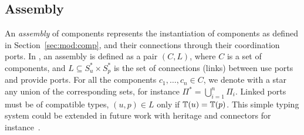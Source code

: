{%


}

\subsection{Assembly}

An \emph{assembly} of components represents the instantiation of components as defined in Section~\ref{sec:mod:comp}, and their connections through their coordination ports. In \mad, an assembly is defined as a pair $(C, L)$, where $C$ is a set of components, and $L \subseteq S_u^* \times S_p^*$ is the set of connections (links) between use ports and provide ports. For all the components $c_1,\dots,c_n \in C$, we denote with a star any union of the corresponding sets, for instance $\Pi^*=\bigcup_{i=1}^{n}\Pi_{i}$. Linked ports must be of compatible types, \ie $(u,p) \in L$ only if $\mathbb{T}(u) = \mathbb{T}(p)$. This simple typing system could be extended in future work with heritage and connectors for instance~\cite{reo}.
